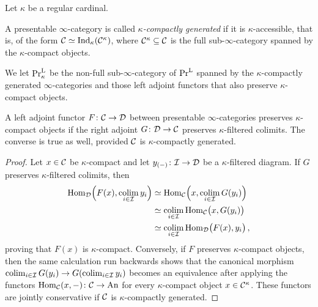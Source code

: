 \begin{defi}\label{def:PrKappa}
	Let $\kappa$ be a regular cardinal.
	\begin{alphanumerate}
		\item A presentable $\infty$-category is called \emph{$\kappa$-compactly generated} if it is $\kappa$-accessible, that is, of the form $\mathcal{C}\simeq \mathrm{Ind}_\kappa(\mathcal{C}^\kappa)$, where $\mathcal{C}^\kappa\subseteq \mathcal{C}$ is the full sub-$\infty$-category spanned by the $\kappa$-compact objects.
		\item We let $\mathrm{Pr}_\kappa^{\mathrm{L}}$ be the non-full sub-$\infty$-category of $\mathrm{Pr}^{\mathrm{L}}$ spanned by the $\kappa$-compactly generated $\infty$-categories and those left adjoint functors that also preserve $\kappa$-compact objects.
	\end{alphanumerate} 
\end{defi}
\begin{lem}\label{lem:LeftAdjointPreservesCompactsRightAdjointPreservesFiltered}
	A left adjoint functor $F\colon \mathcal{C}\rightarrow \mathcal{D}$ between presentable $\infty$-categories preserves $\kappa$-compact objects if the right adjoint $G\colon \mathcal{D}\rightarrow \mathcal{C}$ preserves $\kappa$-filtered colimits. The converse is true as well, provided $\mathcal{C}$ is $\kappa$-compactly generated.
\end{lem}
\begin{proof}
	Let $x\in \mathcal{C}$ be $\kappa$-compact and let $y_{(-)}\colon \mathcal{I}\rightarrow \mathcal{D}$ be a $\kappa$-filtered diagram. If $G$ preserves $\kappa$-filtered colimits, then
	\begin{align*}
		\operatorname{Hom}_{\mathcal{D}}\Bigl(F(x),\operatorname*{colim}_{i\in\mathcal{I}}y_i\Bigr)&\simeq  \operatorname{Hom}_{\mathcal{C}}\Bigl(x,\operatorname*{colim}_{i\in\mathcal{I}}G(y_i)\Bigr)\\
		&\simeq \operatorname*{colim}_{i\in\mathcal{I}}\operatorname{Hom}_{\mathcal{C}}\bigl(x,G(y_i)\bigr)\\
		&\simeq \operatorname*{colim}_{i\in\mathcal{I}}\operatorname{Hom}_{\mathcal{D}}\bigl(F(x),y_i\bigr)\,,
	\end{align*}
	proving that $F(x)$ is $\kappa$-compact. Conversely, if $F$ preserves $\kappa$-compact objects, then the same calculation run backwards shows that the canonical morphism $\operatorname*{colim}_{i\in\mathcal{I}}G(y_i)\rightarrow G(\operatorname*{colim}_{i\in \mathcal{I}}y_i)$ becomes an equivalence after applying the functors $\operatorname{Hom}_{\mathcal{C}}(x,-)\colon \mathcal{C}\rightarrow \mathrm{An}$ for every $\kappa$-compact object $x\in \mathcal{C}^\kappa$. These functors are jointly conservative if $\mathcal{C}$ is $\kappa$-compactly generated. 
\end{proof}
